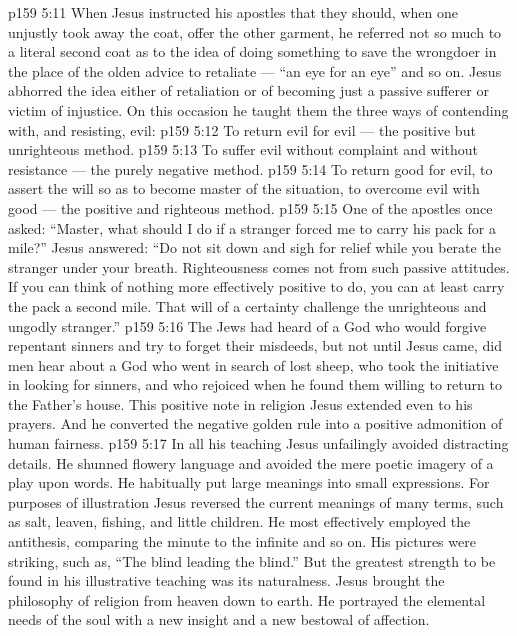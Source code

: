 \vs p159 5:11 When Jesus instructed his apostles that they should, when one unjustly took away the coat, offer the other garment, he referred not so much to a literal second coat as to the idea of doing something  to save the wrongdoer in the place of the olden advice to retaliate --- “an eye for an eye” and so on. Jesus abhorred the idea either of retaliation or of becoming just a passive sufferer or victim of injustice. On this occasion he taught them the three ways of contending with, and resisting, evil:
\vs p159 5:12 \bibnobreakspace To return evil for evil --- the positive but unrighteous method.
\vs p159 5:13 \bibnobreakspace To suffer evil without complaint and without resistance --- the purely negative method.
\vs p159 5:14 \bibnobreakspace To return good for evil, to assert the will so as to become master of the situation, to overcome evil with good --- the positive and righteous method.
\vs p159 5:15 \pc One of the apostles once asked: “Master, what should I do if a stranger forced me to carry his pack for a mile?” Jesus answered: \textcolor{ubdarkred}{“Do not sit down and sigh for relief while you berate the stranger under your breath. Righteousness comes not from such passive attitudes. If you can think of nothing more effectively positive to do, you can at least carry the pack a second mile. That will of a certainty challenge the unrighteous and ungodly stranger.”}
\vs p159 5:16 The Jews had heard of a God who would forgive repentant sinners and try to forget their misdeeds, but not until Jesus came, did men hear about a God who went in search of lost sheep, who took the initiative in looking for sinners, and who rejoiced when he found them willing to return to the Father’s house. This positive note in religion Jesus extended even to his prayers. And he converted the negative golden rule into a positive admonition of human fairness.
\vs p159 5:17 In all his teaching Jesus unfailingly avoided distracting details. He shunned flowery language and avoided the mere poetic imagery of a play upon words. He habitually put large meanings into small expressions. For purposes of illustration Jesus reversed the current meanings of many terms, such as salt, leaven, fishing, and little children. He most effectively employed the antithesis, comparing the minute to the infinite and so on. His pictures were striking, such as, \textcolor{ubdarkred}{“The blind leading the blind.”} But the greatest strength to be found in his illustrative teaching was its naturalness. Jesus brought the philosophy of religion from heaven down to earth. He portrayed the elemental needs of the soul with a new insight and a new bestowal of affection.
